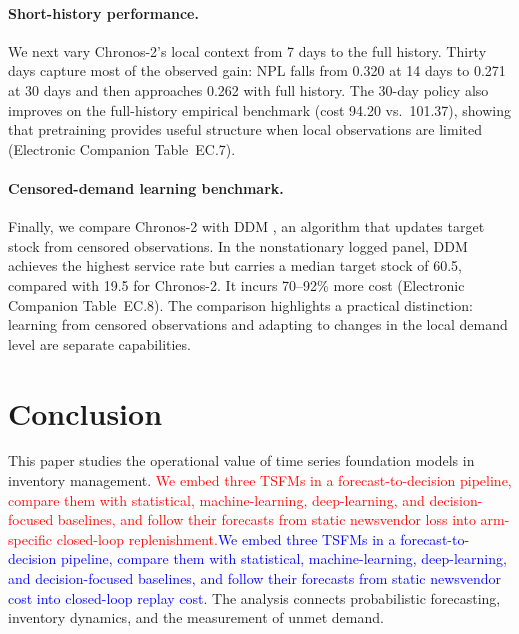 \documentclass[msom,dblanonrev]{informs4}
\newcommand{\add}[1]{\textcolor{blue}{#1}}
\newcommand{\reduce}[1]{\textcolor{red}{#1}\hspace{0.5em}}
\begin{document}
\paragraph{Short-history performance.}\label{sec:ws6}
We next vary Chronos-2's local context from 7 days to the full history.
Thirty days capture most of the observed gain: NPL falls from 0.320 at 14 days to 0.271 at 30 days and then approaches 0.262 with full history.
The 30-day policy also improves on the full-history empirical benchmark (cost 94.20 vs.\ 101.37), showing that pretraining provides useful structure when local observations are limited (Electronic Companion Table~EC.7).

\paragraph{Censored-demand learning benchmark.}\label{sec:ws5}
Finally, we compare Chronos-2 with DDM \citep{ShiChenDuenyas2016}, an algorithm that updates target stock from censored observations.
In the nonstationary logged panel, DDM achieves the highest service rate but carries a median target stock of 60.5, compared with 19.5 for Chronos-2.
It incurs 70--92\% more cost (Electronic Companion Table~EC.8).
The comparison highlights a practical distinction: learning from censored observations and adapting to changes in the local demand level are separate capabilities.

\section{Conclusion}\label{sec:conclusion}

This paper studies the operational value of time series foundation models in inventory management.
\reduce{We embed three TSFMs in a forecast-to-decision pipeline, compare them with statistical, machine-learning, deep-learning, and decision-focused baselines, and follow their forecasts from static newsvendor loss into arm-specific closed-loop replenishment.}\add{We embed three TSFMs in a forecast-to-decision pipeline, compare them with statistical, machine-learning, deep-learning, and decision-focused baselines, and follow their forecasts from static newsvendor cost into closed-loop replay cost.}
The analysis connects probabilistic forecasting, inventory dynamics, and the measurement of unmet demand.
\end{document}
